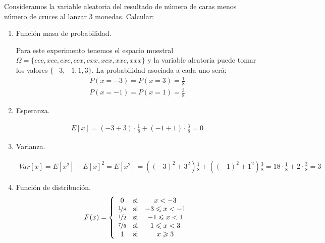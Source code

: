 \begin{ejercicio} Consideramos la variable aleatoria del resultado de número de caras menos número de cruces al lanzar 3 monedas. Calcular:
    
    \begin{enumerate}
        \item Función masa de probabilidad.
        
        Para este experimento tenemos el espacio muestral $\Omega=\{ccc, xcc, cxc, ccx, cxx, xcx, xxc, xxx\}$ y la variable aleatoria puede tomar los valores  $\{-3, -1, 1, 3\}$. La probabilidad asociada a cada uno será:
        \begin{gather*}
            P(x=-3) = P(x=3) = \frac{1}{8}\\
            P(x=-1) = P(x=1) = \frac{3}{8}
        \end{gather*}

        \item Esperanza.
        
        \begin{gather*}
            E[x] = (-3+3) \cdot \frac{1}{8} + (-1+1) \cdot \frac{3}{8} = 0
        \end{gather*}

        \item Varianza.

        \begin{gather*}
            Var[x] = E[x^2]-E[x]^2 = E[x^2] = ((-3)^2 + 3^2) \frac{1}{8} + ((-1)^2+1^2) \frac{3}{8} = 18 \cdot \frac{1}{8} + 2 \cdot \frac{3}{8} = 3
        \end{gather*}

        \item Función de distribución.
        \begin{gather*}
            F(x)=\left\{
            \begin{array}{ccc}
                0 & \text{si} & x<-3\\
                \nicefrac{1}{8}& \text{si} & -3 \leq x < -1 \\
                \nicefrac{1}{2}& \text{si} & -1 \leq x < 1 \\
                \nicefrac{7}{8}& \text{si} & 1 \leq x < 3 \\
                1& \text{si} & x \geq 3
            \end{array}
            \right.
        \end{gather*}
    \end{enumerate}
\end{ejercicio}

